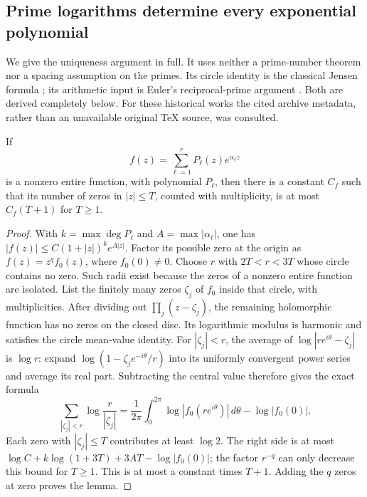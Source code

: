 \subsection{Prime logarithms determine every exponential polynomial}

We give the uniqueness argument in full. It uses neither a
prime-number theorem nor a spacing assumption on the primes.
Its circle identity is the classical Jensen formula
\cite{PO:Jensen}; its arithmetic input is Euler's reciprocal-prime
argument \cite{PO:Euler}. Both are derived completely below.
For these historical works the cited archive metadata, rather
than an unavailable original TeX source, was consulted.

\begin{lemma}\label{PO:lem:zero-count}
If
\[
 f(z)=\sum_{\ell=1}^r P_\ell(z)e^{\alpha_\ell z}
 \tag{PO23}\label{PO:po:exp-polynomial}
\]
is a nonzero entire function, with polynomial \(P_\ell\), then
there is a constant \(C_f\) such that its number of zeros in
\(|z|\le T\), counted with multiplicity, is at most
\(C_f(T+1)\) for \(T\ge1\).
\end{lemma}
\begin{proof}
With \(k=\max\deg P_\ell\) and \(A=\max|\alpha_\ell|\), one has
\(|f(z)|\le C(1+|z|)^k e^{A|z|}\).
Factor its possible zero at the origin as \(f(z)=z^q f_0(z)\),
where \(f_0(0)\ne0\).
Choose \(r\) with \(2T<r<3T\) whose circle contains no zero.
Such radii exist because the zeros of a nonzero entire function
are isolated. List the finitely many zeros \(\zeta_j\) of \(f_0\)
inside that circle, with multiplicities. After dividing out
\(\prod_j(z-\zeta_j)\), the remaining holomorphic function has
no zeros on the closed disc. Its logarithmic modulus is harmonic
and satisfies the circle mean-value identity. For \(|\zeta_j|<r\),
the average of \(\log|re^{i\theta}-\zeta_j|\) is \(\log r\):
expand \(\log(1-\zeta_je^{-i\theta}/r)\) into its uniformly
convergent power series and average its real part.
Subtracting the central value therefore gives the exact formula
\[
 \sum_{|\zeta_j|<r}\log\frac r{|\zeta_j|}
  =\frac1{2\pi}\int_0^{2\pi}
       \log|f_0(re^{i\theta})|\,d\theta-\log|f_0(0)|.
 \tag{PO24}\label{PO:po:circle-count}
\]
Each zero with \(|\zeta_j|\le T\) contributes at least \(\log2\).
The right side is at most
\(\log C+k\log(1+3T)+3AT-\log|f_0(0)|\);
the factor \(r^{-q}\) can only decrease this bound for \(T\ge1\).
This is at most a constant times \(T+1\).
Adding the \(q\) zeros at zero proves the lemma.
\end{proof}

